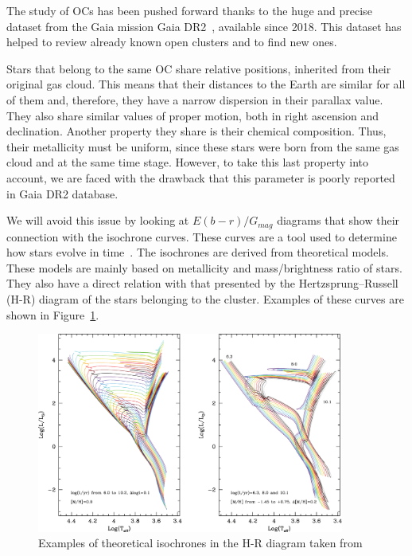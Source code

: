 \documentclass[11pt, a4paper, english]{book}
\begin{document}
The study of OCs has been pushed forward thanks to the huge and precise dataset from the Gaia mission
\cite{collaboration2016description} Gaia DR2~\cite{gaia2018gaia}, available since 2018.
This dataset has helped to review already known open clusters and to find new ones.

Stars that belong to the same OC share relative positions, inherited from their original gas cloud.
This means that their distances to the Earth are similar for all of them and, therefore, they have a narrow dispersion in their parallax value.
They also share similar values of proper motion, both in right ascension and declination.
Another property they share is their chemical composition.
Thus, their metallicity must be uniform, since these stars were born from the same gas cloud and at the same time stage.
However, to take this last property into account, we are faced with the drawback that this parameter is poorly reported in Gaia DR2 database.

We will avoid this issue by looking at $E(b-r) / G_{mag}$ diagrams that show their connection with the isochrone curves.
These curves are a tool used to determine how stars evolve in time~\cite{bressan2012parsec}.
The isochrones are derived from theoretical models.
These models are mainly based on metallicity and mass/brightness ratio of stars.
They also have a direct relation with that presented by the Hertzsprung–Russell (H-R) diagram of the stars belonging to the cluster.
Examples of these curves are shown in Figure~\ref{fig:examples_of_isochrones}.

\begin{figure}[htbp]
  \centering
  \includegraphics[width=0.9\textwidth]{../figures/theoretical_isochrones_in_hr_diagrams.pdf}
  \caption{Examples of theoretical isochrones in the H-R diagram taken from \protect{}}
  \label{fig:examples_of_isochrones}
\end{figure}
\end{document}
